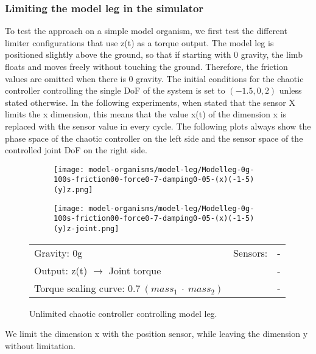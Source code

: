 \documentclass[main]{subfiles}
\begin{document}
\subsubsection{Limiting the model leg in the simulator}

To test the approach on a simple model organism, we first test the different limiter configurations that use z(t) as a torque output. %
%
The model leg is positioned slightly above the ground, so that if starting with 0 gravity, the limb floats and moves freely without touching the ground. %
%
Therefore, the friction values are omitted when there is 0 gravity. %
%
The initial conditions for the chaotic controller controlling the single DoF of the system is set to \((-1.5,0,2)\) unless stated otherwise. %
%
In the following experiments, when stated that the sensor X limits the x dimension, this means that the value x(t) of the dimension x is replaced with the sensor value in every cycle. %
%
The following plots always show the phase space of the chaotic controller on the left side and the sensor space of the controlled joint DoF on the right side.


\begin{figure}[H]
	\centering
	\begin{subfigure}[c]{0.45\textwidth}
	\texttt{[image: model-organisms/model-leg/Modelleg-0g-100s-friction00-force0-7-damping0-05-(x)(-1-5)(y)z.png]}
	\end{subfigure}
	\begin{subfigure}[c]{0.45\textwidth}
	\texttt{[image: model-organisms/model-leg/Modelleg-0g-100s-friction00-force0-7-damping0-05-(x)(-1-5)(y)z-joint.png]}
	\end{subfigure}
	\caption[Unlimited chaotic controller controlling model leg]{Unlimited chaotic controller controlling model leg.}
	\begin{tabular}{l|ll}
	\hline 
	Gravity: 0g  & Sensors: & - \\
	 Output: z(t) \(\rightarrow\) Joint torque & & - \\
	  Torque scaling curve: \(0.7~(mass_1~\cdot~mass_2)\) & & - \\
	  \hline
	\end{tabular}

	\label{figure:unlimited-model-leg}
\end{figure}

We limit the dimension x with the position sensor, while leaving the dimension y without limitation.
\end{document}

